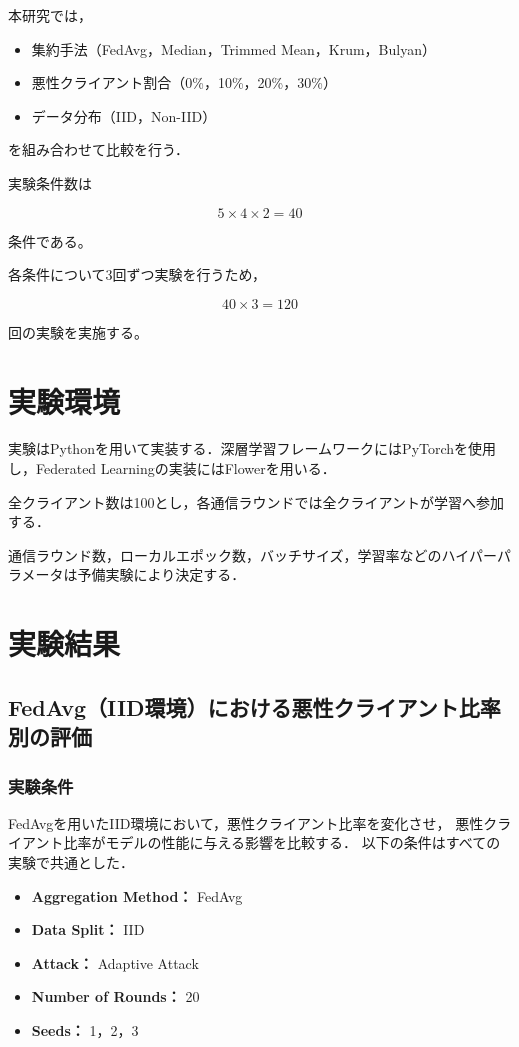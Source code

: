 \documentclass[a4j, twocolumn, dvipdfmx]{jsarticle}  %
\begin{document}
本研究では，

\begin{itemize}
\item 集約手法（FedAvg，Median，Trimmed Mean，Krum，Bulyan）
\item 悪性クライアント割合（0\%，10\%，20\%，30\%）
\item データ分布（IID，Non-IID）
\end{itemize}

を組み合わせて比較を行う．

実験条件数は

\[
5 \times 4 \times 2 = 40
\]

条件である。

各条件について3回ずつ実験を行うため，

\[
40 \times 3 = 120
\]

回の実験を実施する。

\section{実験環境}

実験はPythonを用いて実装する．深層学習フレームワークにはPyTorchを使用し，Federated Learningの実装にはFlowerを用いる．

全クライアント数は100とし，各通信ラウンドでは全クライアントが学習へ参加する．

通信ラウンド数，ローカルエポック数，バッチサイズ，学習率などのハイパーパラメータは予備実験により決定する．

\section{実験結果}

\subsection{FedAvg（IID環境）における悪性クライアント比率別の評価}

\subsubsection{実験条件}

FedAvgを用いたIID環境において，悪性クライアント比率を変化させ，
悪性クライアント比率がモデルの性能に与える影響を比較する．
以下の条件はすべての実験で共通とした．

\begin{itemize}
    \item \textbf{Aggregation Method：} FedAvg
    \item \textbf{Data Split：} IID
    \item \textbf{Attack：} Adaptive Attack
    \item \textbf{Number of Rounds：} 20
    \item \textbf{Seeds：} 1，2，3
\end{itemize}
\end{document}
